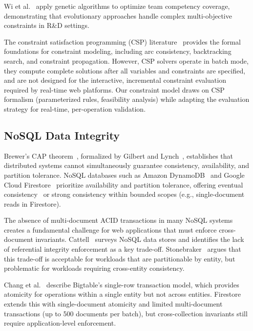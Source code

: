 \documentclass[11pt,a4paper]{article}
\theoremstyle{plain}
\theoremstyle{definition}
\theoremstyle{remark}
\begin{document}
Wi et al.~\cite{wi2009} apply genetic algorithms to optimize team competency coverage, demonstrating that evolutionary approaches handle complex multi-objective constraints in R\&D settings.

The constraint satisfaction programming (CSP) literature~\cite{rossi2006, kumar1992, tsang1999} provides the formal foundations for constraint modeling, including arc consistency, backtracking search, and constraint propagation. However, CSP solvers operate in batch mode, they compute complete solutions after all variables and constraints are specified, and are not designed for the interactive, incremental constraint evaluation required by real-time web platforms. Our constraint model draws on CSP formalism (parameterized rules, feasibility analysis) while adapting the evaluation strategy for real-time, per-operation validation.

\subsection{NoSQL Data Integrity}

Brewer's CAP theorem~\cite{brewer2000}, formalized by Gilbert and Lynch~\cite{gilbert2002}, establishes that distributed systems cannot simultaneously guarantee consistency, availability, and partition tolerance. NoSQL databases such as Amazon DynamoDB~\cite{decandia2007} and Google Cloud Firestore~\cite{firebase} prioritize availability and partition tolerance, offering eventual consistency~\cite{vogels2009} or strong consistency within bounded scopes (e.g., single-document reads in Firestore).

The absence of multi-document ACID transactions in many NoSQL systems creates a fundamental challenge for web applications that must enforce cross-document invariants. Cattell~\cite{cattell2010} surveys NoSQL data stores and identifies the lack of referential integrity enforcement as a key trade-off. Stonebraker~\cite{stonebraker2010} argues that this trade-off is acceptable for workloads that are partitionable by entity, but problematic for workloads requiring cross-entity consistency.

Chang et al.~\cite{chang2006} describe Bigtable's single-row transaction model, which provides atomicity for operations within a single entity but not across entities. Firestore extends this with single-document atomicity and limited multi-document transactions (up to 500 documents per batch), but cross-collection invariants still require application-level enforcement.
\end{document}
